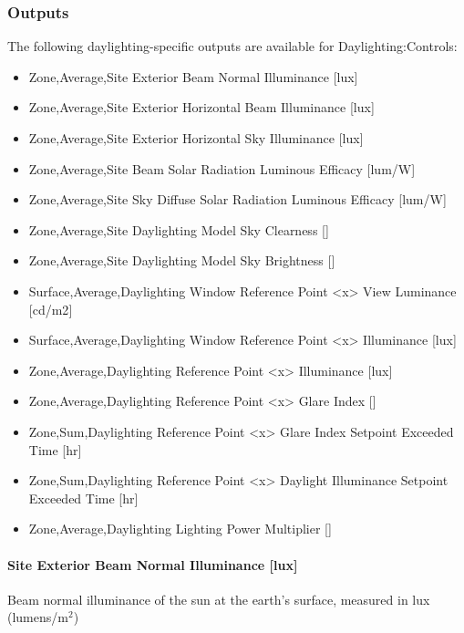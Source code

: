 \subsubsection{Outputs}\label{outputs-1-004}

The following daylighting-specific outputs are available for Daylighting:Controls:

\begin{itemize}
\item
  Zone,Average,Site Exterior Beam Normal Illuminance {[}lux{]}
\item
  Zone,Average,Site Exterior Horizontal Beam Illuminance {[}lux{]}
\item
  Zone,Average,Site Exterior Horizontal Sky Illuminance {[}lux{]}
\item
  Zone,Average,Site Beam Solar Radiation Luminous Efficacy {[}lum/W{]}
\item
  Zone,Average,Site Sky Diffuse Solar Radiation Luminous Efficacy {[}lum/W{]}
\item
  Zone,Average,Site Daylighting Model Sky Clearness {[]}
\item
  Zone,Average,Site Daylighting Model Sky Brightness {[]}
\item
  Surface,Average,Daylighting Window Reference Point <x> View Luminance {[}cd/m2{]}
\item
  Surface,Average,Daylighting Window Reference Point <x> Illuminance {[}lux{]}
\item
  Zone,Average,Daylighting Reference Point <x> Illuminance {[}lux{]}
\item
  Zone,Average,Daylighting Reference Point <x> Glare Index {[]}
\item
  Zone,Sum,Daylighting Reference Point <x> Glare Index Setpoint Exceeded Time {[}hr{]}
\item
  Zone,Sum,Daylighting Reference Point <x> Daylight Illuminance Setpoint Exceeded Time {[}hr{]}
\item
  Zone,Average,Daylighting Lighting Power Multiplier {[]}
\end{itemize}

\paragraph{Site Exterior Beam Normal Illuminance {[}lux{]}}\label{site-exterior-beam-normal-illuminance-lux}

Beam normal illuminance of the sun at the earth's surface, measured in lux (lumens/m\(^{2}\))

